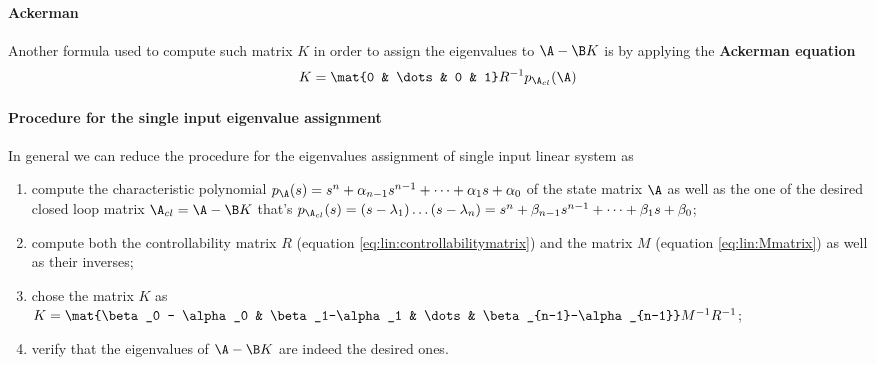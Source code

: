 		\paragraph{Ackerman} Another formula used to compute such matrix $K$ in order to assign the eigenvalues to $\A - \B K$ is by applying the \textbf{Ackerman equation}
		\[ K = \mat{0 & \dots & 0 & 1} R^{-1} p_{\A_{cl}} (\A) \]
		
		\paragraph{Procedure for the single input eigenvalue assignment} In general we can reduce the procedure for the eigenvalues assignment of single input linear system as
		\begin{enumerate}
			\item compute the characteristic polynomial $p_\A(s) = s^n + \alpha_{n-1}s^{n-1} + \dots + \alpha_1 s + \alpha_0$ of the state matrix $\A$ as well as the one of the desired closed loop matrix $\A_{cl} = \A- \B K$ that's $p_{\A_{cl}}(s) = (s - \lambda_1 )\dots(s-\lambda_n) = s^n + \beta_{n-1}s^{n-1} + \dots + \beta_1 s + \beta_0$;
			\item compute both the controllability matrix $R$ (equation \ref{eq:lin:controllabilitymatrix}) and the matrix $M$ (equation \ref{eq:lin:Mmatrix}) as well as their inverses;
			\item chose the matrix $K$ as $K = \mat{\beta_0 - \alpha_0 & \beta_1-\alpha_1 & \dots & \beta_{n-1}-\alpha_{n-1}} M^{-1}R^{-1}$;
			\item verify that the eigenvalues of $\A - \B K$ are indeed the desired ones.
		\end{enumerate}
		
